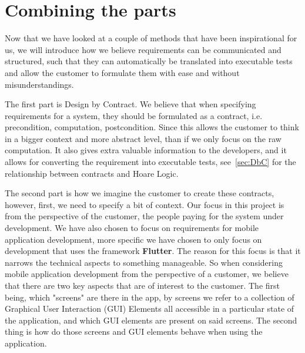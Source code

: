 \section{Combining the parts}\label{sec:combiningtheparts}
Now that we have looked at a couple of methods that have been inspirational for us, we will introduce how we believe requirements can be communicated and structured, such that they can automatically be translated into executable tests and allow the customer to formulate them with ease and without misunderstandings.

The first part is Design by Contract.
We believe that when specifying requirements for a system, they should be formulated as a contract, i.e. precondition, computation, postcondition. 
Since this allows the customer to think in a bigger context and more abstract level, than if we only focus on the raw computation.
It also gives extra valuable information to the developers, and it allows for converting the requirement into executable tests, see~\autoref{sec:DbC} for the relationship between contracts and Hoare Logic.

The second part is how we imagine the customer to create these contracts, however, first, we need to specify a bit of context.
Our focus in this project is from the perspective of the customer, the people paying for the system under development.
We have also chosen to focus on requirements for mobile application development, more specific we have chosen to only focus on development that uses the framework \textbf{Flutter}.
The reason for this focus is that it narrows the technical aspects to something manageable.
So when considering mobile application development from the perspective of a customer, we believe that there are two key aspects that are of interest to the customer.
The first being, which "screens" are there in the app, by screens we refer to a collection of Graphical User Interaction (GUI) Elements all accessible in a particular state of the application, and which GUI elements are present on said screens.
The second thing is how do those screens and GUI elements behave when using the application.


